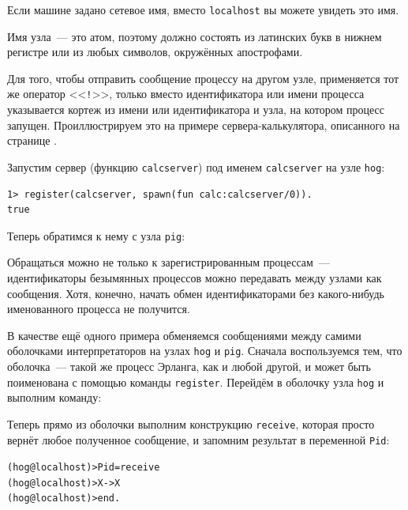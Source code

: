 \documentclass[
  paper=a4,
  fontsize=14pt,
  openany,
  appendixprefix=true
]{scrbook}
\begin{document}
Если машине задано сетевое имя, вместо \lstinline{localhost} вы можете увидеть это имя.

Имя узла~--- это атом, поэтому должно состоять из латинских букв в нижнем регистре или из любых символов, окружённых апострофами.

Для того, чтобы отправить сообщение процессу на другом узле, применяется тот же оператор <<\lstinline{!}>>, только вместо идентификатора или имени процесса указывается кортеж из имени или идентификатора и узла, на котором процесс запущен. Проиллюстрируем это на примере сервера-калькулятора, описанного на странице \pageref{calcserver}.

Запустим сервер (функцию \lstinline{calcserver}) под именем \lstinline{calcserver} на узле \lstinline{hog}:

\begin{verbatim}
1> register(calcserver, spawn(fun calc:calcserver/0)).
true
\end{verbatim}

Теперь обратимся к нему с узла \lstinline{pig}:

Обращаться можно не только к зарегистрированным процессам~--- идентификаторы безымянных процессов можно передавать между узлами как сообщения. Хотя, конечно, начать обмен идентификаторами без какого-нибудь именованного процесса не получится.

В качестве ещё одного примера обменяемся сообщениями между самими оболочками интерпретаторов на узлах \lstinline{hog} и \lstinline{pig}. Сначала воспользуемся тем, что оболочка~--- такой же процесс Эрланга, как и любой другой, и может быть поименована с помощью команды \lstinline{register}. Перейдём в оболочку узла \lstinline{hog} и выполним команду:


Теперь прямо из оболочки выполним конструкцию \lstinline{receive}, которая просто вернёт любое полученное сообщение, и запомним результат в переменной \lstinline{Pid}:


\begin{alltt}
(hog@localhost)> Pid = receive
(hog@localhost)>           X -> X
(hog@localhost)>       end.
\end{alltt}
\addtocounter{erlcommand}{1}
%
\end{document}
